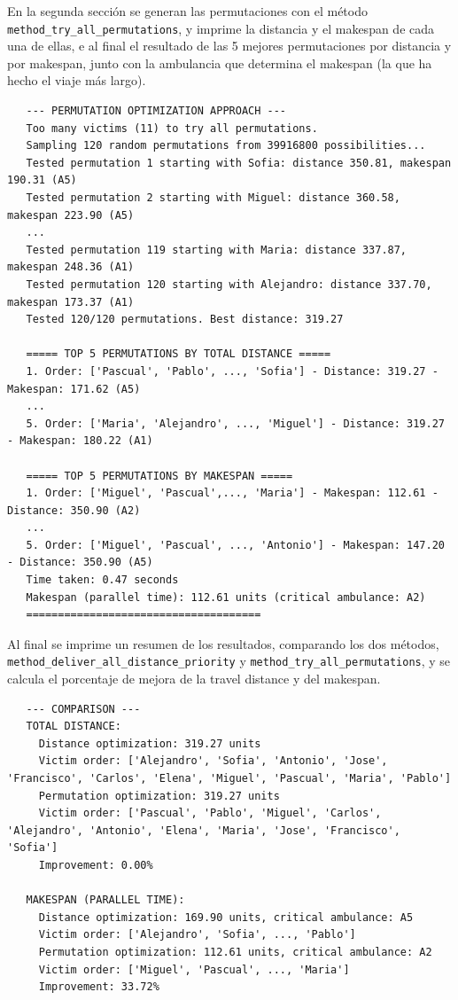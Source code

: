 En la segunda sección se generan las permutaciones con el método \lstinline|method_try_all_permutations|, y imprime la distancia y el makespan de cada una de ellas, e al final
el resultado de las 5 mejores permutaciones por distancia y por makespan, junto con la ambulancia que determina el makespan (la que ha hecho el viaje más largo).
\begin{verbatim}
   --- PERMUTATION OPTIMIZATION APPROACH ---
   Too many victims (11) to try all permutations.
   Sampling 120 random permutations from 39916800 possibilities...
   Tested permutation 1 starting with Sofia: distance 350.81, makespan 190.31 (A5)
   Tested permutation 2 starting with Miguel: distance 360.58, makespan 223.90 (A5)
   ...
   Tested permutation 119 starting with Maria: distance 337.87, makespan 248.36 (A1)
   Tested permutation 120 starting with Alejandro: distance 337.70, makespan 173.37 (A1)
   Tested 120/120 permutations. Best distance: 319.27
   
   ===== TOP 5 PERMUTATIONS BY TOTAL DISTANCE =====
   1. Order: ['Pascual', 'Pablo', ..., 'Sofia'] - Distance: 319.27 - Makespan: 171.62 (A5)
   ...
   5. Order: ['Maria', 'Alejandro', ..., 'Miguel'] - Distance: 319.27 - Makespan: 180.22 (A1)
   
   ===== TOP 5 PERMUTATIONS BY MAKESPAN =====
   1. Order: ['Miguel', 'Pascual',..., 'Maria'] - Makespan: 112.61 - Distance: 350.90 (A2)
   ...
   5. Order: ['Miguel', 'Pascual', ..., 'Antonio'] - Makespan: 147.20 - Distance: 350.90 (A5)
   Time taken: 0.47 seconds
   Makespan (parallel time): 112.61 units (critical ambulance: A2)
   =====================================
\end{verbatim}

Al final se imprime un resumen de los resultados, comparando los dos métodos, \lstinline|method_deliver_all_distance_priority| y \lstinline|method_try_all_permutations|, y se calcula el porcentaje de mejora de la travel distance y del makespan.

\begin{verbatim}
   --- COMPARISON ---
   TOTAL DISTANCE:
     Distance optimization: 319.27 units
     Victim order: ['Alejandro', 'Sofia', 'Antonio', 'Jose', 'Francisco', 'Carlos', 'Elena', 'Miguel', 'Pascual', 'Maria', 'Pablo']
     Permutation optimization: 319.27 units
     Victim order: ['Pascual', 'Pablo', 'Miguel', 'Carlos', 'Alejandro', 'Antonio', 'Elena', 'Maria', 'Jose', 'Francisco', 'Sofia']
     Improvement: 0.00%
   
   MAKESPAN (PARALLEL TIME):
     Distance optimization: 169.90 units, critical ambulance: A5
     Victim order: ['Alejandro', 'Sofia', ..., 'Pablo']
     Permutation optimization: 112.61 units, critical ambulance: A2
     Victim order: ['Miguel', 'Pascual', ..., 'Maria']
     Improvement: 33.72%
\end{verbatim}

